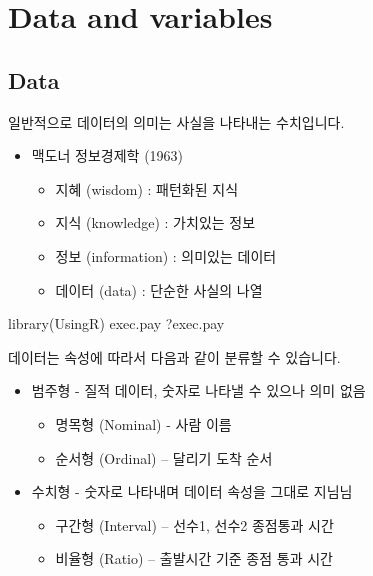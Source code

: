 \documentclass[
]{book}
\newenvironment{Shaded}{\begin{snugshade}}{\end{snugshade}}
\newcommand{\FunctionTok}[1]{\textcolor[rgb]{0.00,0.00,0.00}{#1}}
\newcommand{\NormalTok}[1]{#1}
\providecommand{\tightlist}{%
  \setlength{\itemsep}{0pt}\setlength{\parskip}{0pt}}
\begin{document}
\hypertarget{data-and-variables}{%
\section{Data and variables}\label{data-and-variables}}

\hypertarget{data}{%
\subsection{Data}\label{data}}

일반적으로 데이터의 의미는 사실을 나타내는 수치입니다.

\begin{itemize}
\tightlist
\item
  맥도너 정보경제학 (1963)

  \begin{itemize}
  \tightlist
  \item
    지혜 (wisdom) : 패턴화된 지식
  \item
    지식 (knowledge) : 가치있는 정보
  \item
    정보 (information) : 의미있는 데이터
  \item
    데이터 (data) : 단순한 사실의 나열
  \end{itemize}
\end{itemize}

\begin{Shaded}
\begin{Highlighting}[]
\FunctionTok{library}\NormalTok{(UsingR)}
\NormalTok{exec.pay}
\NormalTok{?exec.pay}
\end{Highlighting}
\end{Shaded}

데이터는 속성에 따라서 다음과 같이 분류할 수 있습니다.

\begin{itemize}
\tightlist
\item
  범주형 - 질적 데이터, 숫자로 나타낼 수 있으나 의미 없음

  \begin{itemize}
  \tightlist
  \item
    명목형 (Nominal) - 사람 이름
  \item
    순서형 (Ordinal) -- 달리기 도착 순서
  \end{itemize}
\item
  수치형 - 숫자로 나타내며 데이터 속성을 그대로 지님님

  \begin{itemize}
  \tightlist
  \item
    구간형 (Interval) -- 선수1, 선수2 종점통과 시간
  \item
    비율형 (Ratio) -- 출발시간 기준 종점 통과 시간
  \end{itemize}
\end{itemize}
\end{document}
